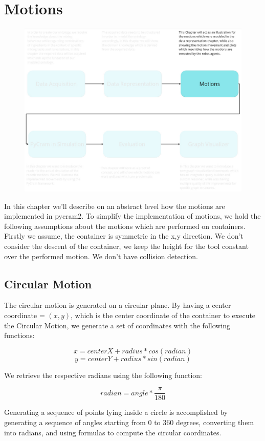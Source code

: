 \section{Motions}
\label{chap:Motions}
\begin{figure}[H]
    \includegraphics[scale=0.3]{Graphics/overview_3.jpg}
\end{figure}
In this chapter we'll describe on an abstract level how the motions are implemented in pycram2.
To simplify the implementation of motions, we hold the following assumptions about the motions which are performed on containers.
Firstly we assume, the container is symmetric in the x,y direction. We don't consider the descent of the container, we keep the height for the tool
constant over the performed motion. We don't have collision detection.

\subsection{Circular Motion}
The circular motion is generated on a circular plane. 
By having a center coordinate = $(x,y)$, which is the center coordinate of 
the container to execute the Circular Motion, we generate a set of coordinates
with the following functions: 

\[x = centerX + radius * cos(radian)\]
\[y = centerY + radius * sin(radian)\]

We retrieve the respective radians using the following function:

\[radian = angle * \frac{\pi}{180}\]

Generating a sequence of points lying inside a circle is accomplished by generating a sequence of angles starting from 0 to 360 degrees, 
converting them into radians, and using formulas to compute the circular coordinates.

